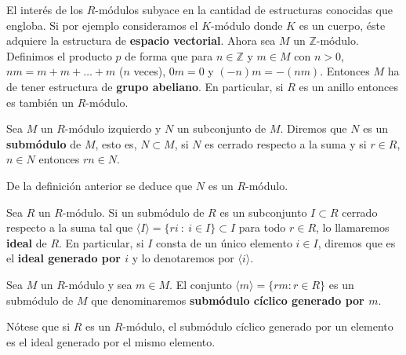 \begin{ejemplo}
	El interés de los \(R\)-módulos subyace en la cantidad de estructuras conocidas que
	engloba. Si por ejemplo consideramos el \(K\)-módulo donde \(K\) es un cuerpo, éste
	adquiere la estructura de \textbf{espacio vectorial}. Ahora sea \(M\) un \(\mathbb{Z}\)-módulo.
	Definimos el producto \(p\) de forma que para \(n \in \mathbb{Z}\) y \(m \in M\) con
	\(n>0\), \(nm = m + m + \ldots + m\) (\(n\) veces), \(0m=0\) y \((-n)m = -(nm)\). Entonces
	\(M\) ha de tener estructura de \textbf{grupo abeliano}. En particular, si \(R\)
	es un anillo entonces es también un \(R\)-módulo.
\end{ejemplo}

\begin{definicion}
	Sea \(M\) un \(R\)-módulo izquierdo y \(N\) un subconjunto de \(M\). Diremos que \(N\)
	es un \textbf{submódulo} de \(M\), esto es, \(N \subset M\), si \(N\) es cerrado
	respecto a la suma y si \(r \in R\), \(n \in N\) entonces \(rn \in N\).
\end{definicion}
De la definición anterior se deduce que \(N\) es un \(R\)-módulo.
\begin{definicion}
	Sea \(R\) un \(R\)-módulo. Si un submódulo de \(R\) es un subconjunto \(I \subset R\)
	cerrado respecto a la suma tal que
	\(\langle I \rangle = \{ri \ : \ i \in I\} \subset I\) para todo \(r \in R\), lo llamaremos
	\textbf{ideal} de \(R\). En particular, si \(I\) consta de un único elemento
	\(i \in I\), diremos que es el \textbf{ideal generado por \(i\)} y lo denotaremos
	por \(\langle i \rangle\).
\end{definicion}

\begin{definicion}
	Sea \(M\) un \(R\)-módulo y sea \(m \in M\). El conjunto
	\(\langle m \rangle = \{r m : r \in R\}\) es un submódulo de \(M\) que
	denominaremos \textbf{submódulo cíclico generado por \(m\)}.
\end{definicion}
\begin{observacion}
	Nótese que si \(R\) es un \(R\)-módulo, el submódulo cíclico generado por un
	elemento es el ideal generado por el mismo elemento.
\end{observacion}

